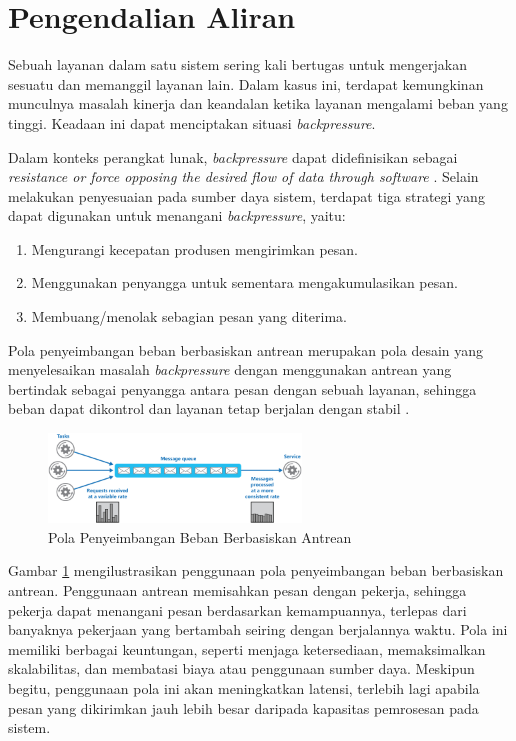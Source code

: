 \section{Pengendalian Aliran}

Sebuah layanan dalam satu sistem sering kali bertugas untuk mengerjakan sesuatu dan memanggil layanan lain. Dalam kasus ini, terdapat kemungkinan munculnya masalah kinerja dan keandalan ketika layanan mengalami beban yang tinggi. Keadaan ini dapat menciptakan situasi \textit{backpressure}.

Dalam konteks perangkat lunak, \textit{backpressure} dapat didefinisikan sebagai \textit{resistance or force opposing the desired flow of data through software} \parencite{backpressureExplained}. Selain melakukan penyesuaian pada sumber daya sistem, terdapat tiga strategi yang dapat digunakan untuk menangani \textit{backpressure}, yaitu:

\begin{enumerate}
    \item Mengurangi kecepatan produsen mengirimkan pesan.
    \item Menggunakan penyangga untuk sementara mengakumulasikan pesan.
    \item Membuang/menolak sebagian pesan yang diterima.
\end{enumerate}

Pola penyeimbangan beban berbasiskan antrean merupakan pola desain yang menyelesaikan masalah \textit{backpressure} dengan menggunakan antrean yang bertindak sebagai penyangga antara pesan dengan sebuah layanan, sehingga beban dapat dikontrol dan layanan tetap berjalan dengan stabil \parencite{queueLoadLeveling}.

\begin{figure}[htbp]
    \centering
    \includegraphics[width=0.6\textwidth]{resources/chapter-2/queue-based-load-leveling-pattern.png}
    \caption{Pola Penyeimbangan Beban Berbasiskan Antrean \parencite{queueLoadLeveling}}
    \label{fig:queue-based-load-leveling-pattern}
\end{figure}

Gambar \ref{fig:queue-based-load-leveling-pattern} mengilustrasikan penggunaan pola penyeimbangan beban berbasiskan antrean. Penggunaan antrean memisahkan pesan dengan pekerja, sehingga pekerja dapat menangani pesan berdasarkan kemampuannya, terlepas dari banyaknya pekerjaan yang bertambah seiring dengan berjalannya waktu. Pola ini memiliki berbagai keuntungan, seperti menjaga ketersediaan, memaksimalkan skalabilitas, dan membatasi biaya atau penggunaan sumber daya. Meskipun begitu, penggunaan pola ini akan meningkatkan latensi, terlebih lagi apabila pesan yang dikirimkan jauh lebih besar daripada kapasitas pemrosesan pada sistem.